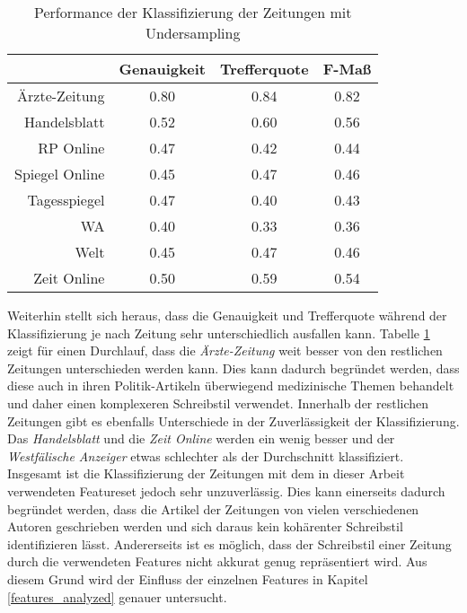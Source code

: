 \begin{table}[h]
\centering
\begin{spacing}{1.25}
\begin{tabular}[t]{rccc}
\toprule
~ & Genauigkeit & Trefferquote & F-Maß\\
\midrule
Ärzte-Zeitung & 0.80 & 0.84 & 0.82\\
Handelsblatt & 0.52 & 0.60 & 0.56\\
RP Online & 0.47 & 0.42 & 0.44\\
Spiegel Online & 0.45 & 0.47 & 0.46\\
Tagesspiegel & 0.47 & 0.40 & 0.43\\
WA & 0.40 & 0.33 & 0.36\\
Welt & 0.45 & 0.47 & 0.46\\
Zeit Online & 0.50 & 0.59 & 0.54\\
\bottomrule
\end{tabular}
\caption{Performance der Klassifizierung der Zeitungen mit Undersampling}
\label{table.undersampling_individual}
\end{spacing}
\end{table}

Weiterhin stellt sich heraus, dass die Genauigkeit und Trefferquote während der Klassifizierung je nach Zeitung sehr unterschiedlich ausfallen kann. Tabelle \ref{table.undersampling_individual} zeigt für einen Durchlauf, dass die \emph{Ärzte-Zeitung} weit besser von den restlichen Zeitungen unterschieden werden kann. Dies kann dadurch begründet werden, dass diese auch in ihren Politik-Artikeln überwiegend medizinische Themen behandelt und daher einen komplexeren Schreibstil verwendet. Innerhalb der restlichen Zeitungen gibt es ebenfalls Unterschiede in der Zuverlässigkeit der Klassifizierung. Das \emph{Handelsblatt} und die \emph{Zeit Online} werden ein wenig besser und der \emph{Westfälische Anzeiger} etwas schlechter als der Durchschnitt klassifiziert. Insgesamt ist die Klassifizierung der Zeitungen mit dem in dieser Arbeit verwendeten Featureset jedoch sehr unzuverlässig. Dies kann einerseits dadurch begründet werden, dass die Artikel der Zeitungen von vielen verschiedenen Autoren geschrieben werden und sich daraus kein kohärenter Schreibstil identifizieren lässt. Andererseits ist es möglich, dass der Schreibstil einer Zeitung durch die verwendeten Features nicht akkurat genug repräsentiert wird. Aus diesem Grund wird der Einfluss der einzelnen Features in Kapitel \ref{features_analyzed} genauer untersucht.

